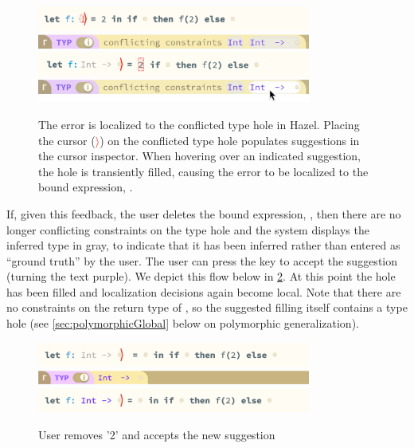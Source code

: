 \begin{figure}[H]
\includegraphics[width=9cm]{images/example_conflict.png}
\includegraphics[width=9cm]{images/example-conflict-newnew.png}
\includegraphics[width=9cm]{images/example_conflict_hover.png}
\includegraphics[width=9cm]{images/example-conflict-hover-final.png}
\caption{The error is localized to the conflicted type hole in Hazel. Placing the cursor (\textcolor{red}{$\rangle$}) on the conflicted type hole populates suggestions in the cursor inspector. When hovering over an indicated suggestion, the hole is transiently filled, causing the error to be localized to the bound expression, .}
\label{fig:editor_conflict}
\end{figure}

If, given this feedback, the user deletes the bound expression, , then there are no longer conflicting constraints on the type hole and the system displays the inferred type in gray, to indicate that it has been inferred rather than entered as ``ground truth'' by the user. The user can press the  key to accept the suggestion (turning the text purple). We depict this flow below in \cref{fig:editor_ghost}. At this point the hole has been filled and localization decisions again become local. Note that there are no constraints on the return type of , so the suggested filling itself contains a type hole (see \cref{sec:polymorphicGlobal} below on polymorphic generalization).
\begin{figure}[H]
\includegraphics[width=9cm]{images/example_holes_filled.png}
\includegraphics[width=9cm]{images/example_holes_CI.png}
\includegraphics[width=9cm]{images/example_holes.png}
\caption{User removes '2' and accepts the new suggestion}
\label{fig:editor_ghost}
\end{figure}

